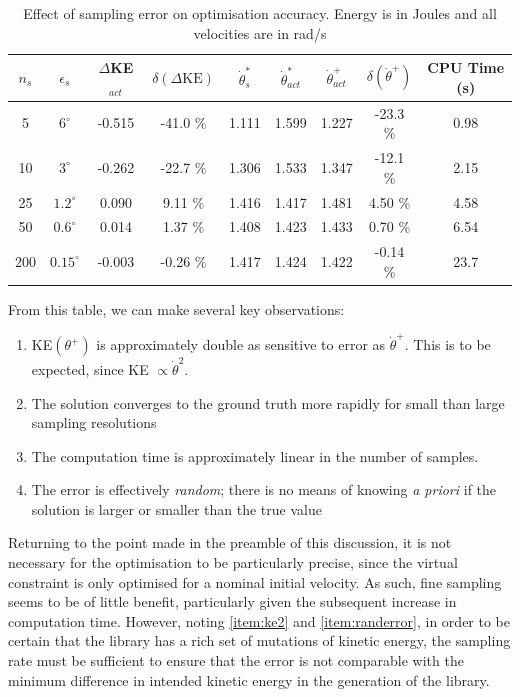 \begin{table}
	\centering
	\begin{tabular}{ c | c || c | c || c | c | c  | c || c }
		$n_s$ & $\epsilon_s$ & $\Delta$KE$_{act}$ & $\delta(\Delta\mathrm{KE})$ & $\dot{\theta}^*_s$ & $\dot{\theta}^*_{act}$ & $\dot{\theta}^+_{act}$ & $\delta(\dot{\theta}^+)$ & CPU Time (s) \\ \hline
		5   & $6^\circ$    & -0.515 & -41.0 \% & 1.111 & 1.599 & 1.227 & -23.3 \% & 0.98 \\
		10  & $3^\circ$    & -0.262 & -22.7 \% & 1.306 & 1.533 & 1.347 & -12.1 \% & 2.15 \\
		25  & $1.2^\circ$  & 0.090  & 9.11 \%  & 1.416 & 1.417 & 1.481 & 4.50 \%  & 4.58 \\
		50  & $0.6^\circ$  & 0.014  & 1.37 \%  & 1.408 & 1.423 & 1.433 & 0.70 \%  & 6.54 \\
		200 & $0.15^\circ$ & -0.003 & -0.26 \% & 1.417 & 1.424 & 1.422 & -0.14 \% & 23.7
	\end{tabular}
	\caption[Effect of sampling error on optimisation accuracy]{Effect of sampling error on optimisation accuracy. Energy is in Joules and all velocities are in rad/s}
	\label{tab:samplingerror}
\end{table}

From this table, we can make several key observations:
\begin{adjustwidth}{0.5cm}{}
\begin{enumerate}[label=\bfseries Obs \arabic*, parsep=0pt]
	\item KE$(\theta^+)$ is approximately double as sensitive to error as $\dot{\theta}^+$. This is to be expected, since KE $\propto \dot{\theta}^2$. \label{item:ke2}
	\item The solution converges to the ground truth more rapidly for small than large sampling resolutions
	\item The computation time is approximately linear in the number of samples.
	\item The error is effectively \textit{random}; there is no means of knowing \textit{a priori} if the solution is larger or smaller than the true value \label{item:randerror}
\end{enumerate}
\end{adjustwidth}

Returning to the point made in the preamble of this discussion, it is not necessary for the optimisation to be particularly precise, since the virtual constraint is only optimised for a nominal initial velocity. As such, fine sampling seems to be of little benefit, particularly given the subsequent increase in computation time. However, noting \ref{item:ke2} and \ref{item:randerror}, in order to be certain that the library has a rich set of mutations of kinetic energy, the sampling rate must be sufficient to ensure that the error is not comparable with the minimum difference in intended kinetic energy in the generation of the library.

